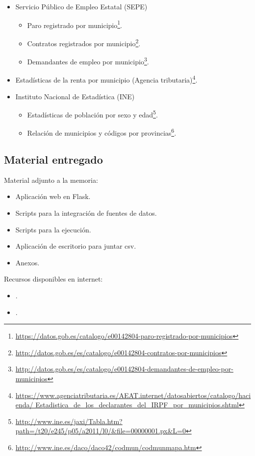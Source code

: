 \begin{itemize}
	\tightlist
	\item
	Servicio Público de Empleo Estatal (SEPE)
	\begin{itemize}
		\tightlist
		\item
		Paro registrado por municipio\footnote{\href{https://datos.gob.es/catalogo/e00142804-paro-registrado-por-municipios}{https://datos.gob.es/catalogo/e00142804-paro-registrado-por-municipios}}.
		\item
		Contratos registrados por municipio\footnote{\href{http://datos.gob.es/es/catalogo/e00142804-contratos-por-municipios}{http://datos.gob.es/es/catalogo/e00142804-contratos-por-municipios}}.
		\item
		Demandantes de empleo por municipio\footnote{\href{http://datos.gob.es/es/catalogo/e00142804-demandantes-de-empleo-por-municipios}{http://datos.gob.es/es/catalogo/e00142804-demandantes-de-empleo-por-municipios}}.
	\end{itemize}
	\item 
	Estadísticas de la renta por municipio (Agencia tributaria)\footnote{\href{https://www.agenciatributaria.es/AEAT.internet/datosabiertos/catalogo/hacienda/Estadistica\_de\_los\_declarantes\_del\_IRPF\_por\_municipios.shtml}{https://www.agenciatributaria.es/AEAT.internet/datosabiertos/catalogo/hacienda/ Estadistica\_de\_los\_declarantes\_del\_IRPF\_por\_municipios.shtml}}.
	\item
	Instituto Nacional de Estadística (INE)
	\begin{itemize}
		\item
		Estadísticas de población por sexo y edad\footnote{\href{http://www.ine.es/jaxi/Tabla.htm?path=/t20/e245/p05/a2011/l0/\&file=00000001.px\&L=0}{http://www.ine.es/jaxi/Tabla.htm?path=/t20/e245/p05/a2011/l0/\&file=00000001.px\&L=0}}.
		\item
		Relación de municipios y códigos por provincias\footnote{\href{http://www.ine.es/daco/daco42/codmun/codmunmapa.htm}{http://www.ine.es/daco/daco42/codmun/codmunmapa.htm}}.
	\end{itemize}
\end{itemize}


\subsection{Material entregado}

Material adjunto a la memoria:

\begin{itemize}
	\item 
	Aplicación web en Flask.
	\item 
	Scripts para la integración de fuentes de datos.
	\item
	Scripts para la ejecución.
	\item 
	Aplicación de escritorio para juntar csv.
	\item 
	Anexos.
\end{itemize}

Recursos disponibles en internet:

\begin{itemize}
	\item 
	.
	\item
	.
\end{itemize}
